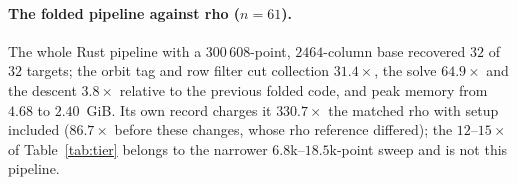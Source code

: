 \begin{table}[t]
\centering\small
\caption{Complete index calculus on $E_0/\FF_{2^{19}}$, $r=130\,873$, ten scalars each, all logarithms verified. Speedup is the paired mean of baseline/variant CPU with a 95\% bootstrap interval.}
\label{tab:n19}
\end{table}

\paragraph{The folded pipeline against rho ($n=61$).}
The whole Rust pipeline with a $300\,608$-point, $2464$-column base
recovered $32$ of $32$ targets; the orbit tag and row filter cut
collection $31.4\times$, the solve $64.9\times$ and the descent
$3.8\times$ relative to the previous folded code, and peak memory from
$4.68$ to $2.40$~GiB. Its own record charges it $330.7\times$ the
matched rho with setup included ($86.7\times$ before these changes,
whose rho reference differed); the $12$--$15\times$ of
Table~\ref{tab:tier} belongs to the narrower $6.8$k--$18.5$k-point
sweep and is not this pipeline.

